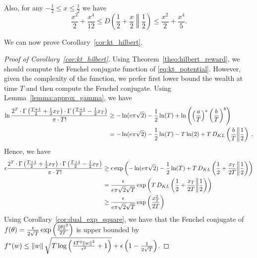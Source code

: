 Also, for any $-\frac{1}{2} \leq x\leq \frac{1}{2}$ we have
\[
\frac{x^2}{2} +\frac{x^4}{12}\leq D\left(\frac{1}{2}+\frac{x}{2}\middle\|\frac{1}{2}\right) \leq \frac{x^2}{2} + \frac{x^4}{5}.
\]

We can now prove Corollary~\ref{cor:kt_hilbert}.
\begin{proof}[Proof of Corollary~\ref{cor:kt_hilbert}]
Using Theorem~\ref{theo:hilbert_reward}, we should compute the Fenchel conjugate function of \eqref{eq:kt_potential}.
However, given the complexity of the function, we prefer first lower bound the wealth at time $T$ and then compute the Fenchel conjugate.
Using Lemma~\ref{lemma:approx_gamma}, we have
\begin{align*}
\ln \frac{2^T \cdot \Gamma \left(\frac{T+1}{2} + \frac{1}{2} x_{T} \right) \cdot \Gamma \left(\frac{T+1}{2} - \frac{1}{2} x_{T} \right)}{\pi \cdot T!} 
&\geq -\ln(e \pi \sqrt{2}) -\frac{1}{2} \ln(T) +\ln \left(\left( \frac{a}{T} \right)^a \left( \frac{b}{T} \right)^b\right) \\
&= -\ln(e \pi \sqrt{2}) -\frac{1}{2} \ln(T) -T \ln (2) + T \, D_{KL}\left(\frac{b}{T}\middle\|\frac{1}{2}\right) \; .
\end{align*}
Hence, we have
\begin{align*}
\epsilon  \frac{2^T \cdot \Gamma \left(\frac{T+1}{2} + \frac{1}{2} x_{T} \right) \cdot \Gamma \left(\frac{T+1}{2} - \frac{1}{2} x_{T} \right)}{\pi \cdot T!} 
&\geq \epsilon \exp\left(-\ln(e \pi \sqrt{2}) -\frac{1}{2} \ln(T) + T \, D_{KL}\left(\frac{1}{2}+\frac{x_T}{2T}\middle\|\frac{1}{2}\right)\right) \\
&= \frac{\epsilon}{e \pi \sqrt{2} \sqrt{T}} \exp\left(T \, D_{KL}\left(\frac{1}{2}+\frac{x_T}{2T}\middle\|\frac{1}{2}\right)\right) \\
&\geq \frac{\epsilon}{e \pi \sqrt{2} \sqrt{T}} \exp\left(\frac{x_T^2}{2T}\right)
\end{align*}
Using Corollary~\ref{cor:dual_exp_square}, we have that the Fenchel conjugate of $f(\theta)=\frac{\epsilon}{2\sqrt{T}} \exp\left(\frac{\left\|{\theta}\right\|^2}{2 T}\right)$ is upper bounded by $f^*(w) \leq \left\|{w}\right\| \sqrt{T \log \left(\frac{4 T^2 \left\|{w}\right\|^2}{\epsilon^2} +1 \right)}+\epsilon\left(1-\frac{1}{2\sqrt{T}}\right)$.
\end{proof}


